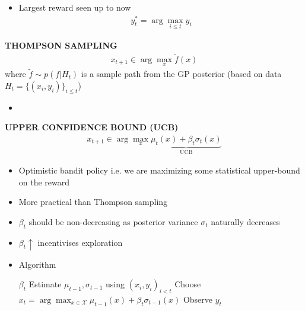 \begin{itemize}
    \item Largest reward seen up to now
    \begin{align*}
        y_t^*=\arg\max_{i\leq t}y_i
    \end{align*}
\end{itemize}

\begin{whitebox}{\textbf{THOMPSON SAMPLING}}
    \begin{align*}
        x_{t+1}\in\arg\max_x \tilde{f}(x)
    \end{align*}
    where $\tilde{f}\sim p(f|H_t)$ is a sample path from the GP posterior (based on data $H_t=\{(x_i,y_i)\}_{i\leq t}$)
    \begin{itemize}
        \item 
    \end{itemize}
\end{whitebox}

\begin{whitebox}{\textbf{UPPER CONFIDENCE BOUND (UCB)}}
    \begin{align*}
        x_{t+1}\in\arg\max_x \underbrace{\mu_t(x)+\beta_t\sigma_t(x)}_{\text{UCB}}
    \end{align*}
    \begin{itemize}
        \item Optimistic bandit policy i.e. we are maximizing some statistical upper-bound on the reward
        \item More practical than Thompson sampling
        \item $\beta_t$ should be non-decreasing as posterior variance $\sigma_t$ naturally decreases
        \item $\beta_t\uparrow$ incentivises exploration
        \item Algorithm
        \begin{center}
            \begin{algorithmic}
                \Require $\beta_t$
                \State Estimate $\mu_{t-1},\sigma_{t-1}$ using $(x_i,y_i)_{i<t}$
                \State Choose $x_t=\arg\max_{x\in\mathcal{X}}\mu_{t-1}(x)+\beta_t\sigma_{t-1}(x)$
                \State Observe $y_t$
                \EndFor
            \end{algorithmic}
        \end{center}
    \end{itemize}
\end{whitebox}

